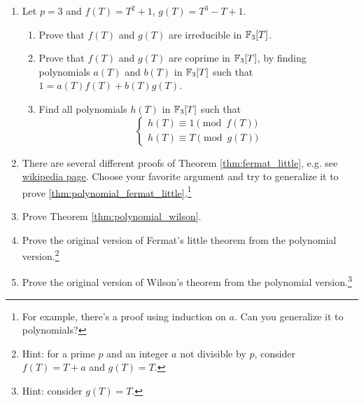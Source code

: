 \begin{enumerate}
    \item Let $p = 3$ and $f(T) = T^2 + 1$, $g(T) = T^3 - T + 1$.
    \begin{enumerate}
        \item Prove that $f(T)$ and $g(T)$ are irreducible in $\mathbb{F}_3[T]$.
        \item Prove that $f(T)$ and $g(T)$ are coprime in $\mathbb{F}_3[T]$, by finding polynomials $a(T)$ and $b(T)$ in $\mathbb{F}_3[T]$ such that $1 = a(T)f(T) + b(T)g(T)$.
        \item Find all polynomials $h(T)$ in $\mathbb{F}_3[T]$ such that 
        \[
        \begin{cases}
            h(T) \equiv 1 \pmod{f(T)} \\
            h(T) \equiv T \pmod{g(T)}
        \end{cases} 
        \]
    \end{enumerate}
    \item There are several different proofs of Theorem \ref{thm:fermat_little}, e.g. see \href{https://en.wikipedia.org/wiki/Proofs_of_Fermat%27s_little_theorem}{wikipedia page}.
    Choose your favorite argument and try to generalize it to prove \ref{thm:polynomial_fermat_little}.\footnote{For example, there's a proof using induction on $a$. Can you generalize it to polynomials?}
    \item Prove Theorem \ref{thm:polynomial_wilson}.
    \item Prove the original version of Fermat's little theorem from the polynomial version.\footnote{Hint: for a prime $p$ and an integer $a$ not divisible by $p$, consider $f(T) = T + a$ and $g(T) = T$.}
    \item Prove the original version of Wilson's theorem from the polynomial version.\footnote{Hint: consider $g(T) = T$.} 
\end{enumerate}